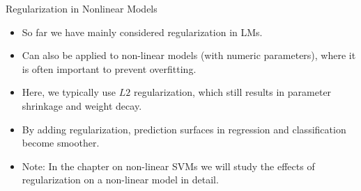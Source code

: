 \begin{vbframe}{Regularization in Nonlinear Models}

\begin{itemize}
  \item So far we have mainly considered regularization in LMs.
  \item Can also be applied to non-linear models (with numeric parameters), where it is
  often important to prevent overfitting.
  \item Here, we typically use $L2$ regularization, which
      still results in parameter shrinkage and weight decay.
  \item By adding regularization, prediction surfaces in regression and
  classification become smoother.
  \item Note: In the chapter on non-linear SVMs we will study the effects of
  regularization on a non-linear model in detail.
\end{itemize}

\end{vbframe}


